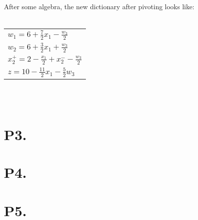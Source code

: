 \documentclass[12pt]{article}
\begin{document}
After some algebra, the new dictionary after pivoting looks like:\\
\\
\begin{tabular}{l}
  $w_{1} = 6 + \frac{7}{2}x_{1} - \frac{w_{3}}{2}$\\[.5em]
  $w_{2} = 6 + \frac{3}{2}x_{1} + \frac{w_{3}}{2}$\\[.5em]
  $x^{+}_{2} = 2 - \frac{x_{1}}{2} + x^{-}_{2} - \frac{w_{3}}{2}$\\[.5em]
  \hline
  $z = 10 - \frac{11}{2}x_{1} - \frac{5}{2}w_{3}$\\
\end{tabular}
\\
\\
\section*{P3.}

\section*{P4.}

\section*{P5.}
\end{document}
